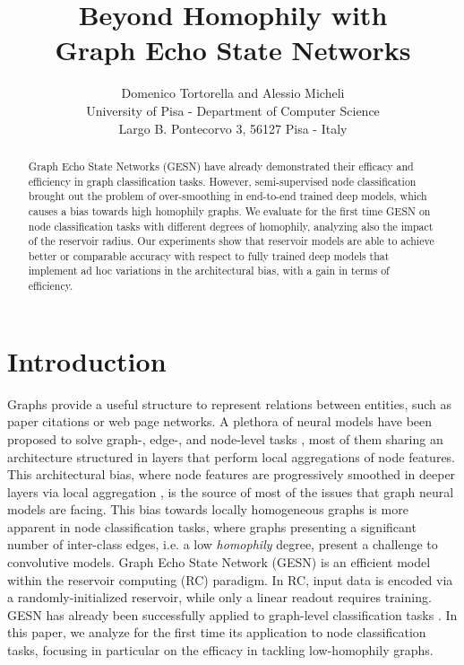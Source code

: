\documentclass{esannV2p}
\begin{document}
\title{Beyond Homophily with\\ Graph Echo State Networks}

\author{Domenico Tortorella and Alessio Micheli
\vspace{.3cm}\\
University of Pisa - Department of Computer Science \\
Largo B. Pontecorvo 3, 56127 Pisa - Italy
}

\maketitle

\begin{abstract}
Graph Echo State Networks (GESN) have already demonstrated their efficacy and efficiency in graph classification tasks.
However, semi-supervised node classification brought out the problem of over-smoothing in end-to-end trained deep models, which causes a bias towards high homophily graphs.
We evaluate for the first time GESN on node classification tasks with different degrees of homophily, analyzing also the impact of the reservoir radius.
Our experiments show that reservoir models are able to achieve better or comparable accuracy with respect to fully trained deep models that implement ad hoc variations in the architectural bias, with a gain in terms of efficiency.
\end{abstract}

\section{Introduction}
Graphs provide a useful structure to represent relations between entities, such as paper citations or web page networks.
A plethora of neural models have been proposed to solve graph-, edge-, and node-level tasks \cite{Bacciu2020}, most of them sharing an architecture structured in layers that perform local aggregations of node features.
This architectural bias, where node features are progressively smoothed in deeper layers via local aggregation \cite{Li2018}, is the source of most of the issues that graph neural models are facing.
This bias towards locally homogeneous graphs is more apparent in node classification tasks, where graphs presenting a significant number of inter-class edges, i.e. a low \emph{homophily} degree, present a challenge to convolutive models.
Graph Echo State Network (GESN) \cite{Gallicchio2010} is an efficient model within the reservoir computing (RC) paradigm.
In RC, input data is encoded via a randomly-initialized reservoir, while only a linear readout requires training.
GESN has already been successfully applied to graph-level classification tasks \cite{Gallicchio2020}.
In this paper, we analyze for the first time its application to node classification tasks, focusing in particular on the efficacy in tackling low-homophily graphs.
\end{document}
